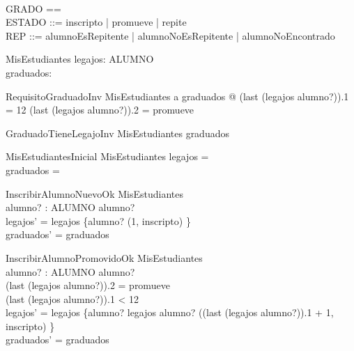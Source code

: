\begin{zed}
    [ALUMNO] \\
    GRADO == \nat \\
    ESTADO ::= inscripto | promueve | repite \\
    REP ::= alumnoEsRepitente | alumnoNoEsRepitente | alumnoNoEncontrado
\end{zed}

\begin{schema}{MisEstudiantes}
    legajos: ALUMNO \pfun {} \\
    graduados: 
\end{schema}

\begin{schema}{RequisitoGraduadoInv}
    MisEstudiantes
    \where
    \forall a \in graduados @ (last \; (legajos \; alumno?)).1 = 12 \land (last \; (legajos \; alumno?)).2 = promueve
\end{schema}

\begin{schema}{GraduadoTieneLegajoInv}
    MisEstudiantes
    \where
    graduados \subseteq {}
\end{schema}

\begin{schema}{MisEstudiantesInicial}
    MisEstudiantes
    \where
    legajos = \emptyset \\
    graduados = \emptyset
\end{schema}

\begin{schema}{InscribirAlumnoNuevoOk}
    \Delta MisEstudiantes \\
    alumno? : ALUMNO
    \where
    alumno? \notin {} \\
    legajos' = legajos \cup \{alumno? \mapsto \langle (1, inscripto) \rangle\} \\
    graduados' = graduados
\end{schema}

\begin{schema}{InscribirAlumnoPromovidoOk}
    \Delta MisEstudiantes \\
    alumno? : ALUMNO
    \where
    alumno? \in {} \\
    (last \; (legajos \; alumno?)).2 = promueve \\
    (last \; (legajos \; alumno?)).1 < 12 \\ 
    legajos' = legajos \oplus \{alumno? \mapsto legajos \; alumno? \cat \langle ((last \; (legajos \; alumno?)).1 + 1, inscripto) \rangle\} \\
    graduados' = graduados
\end{schema}

